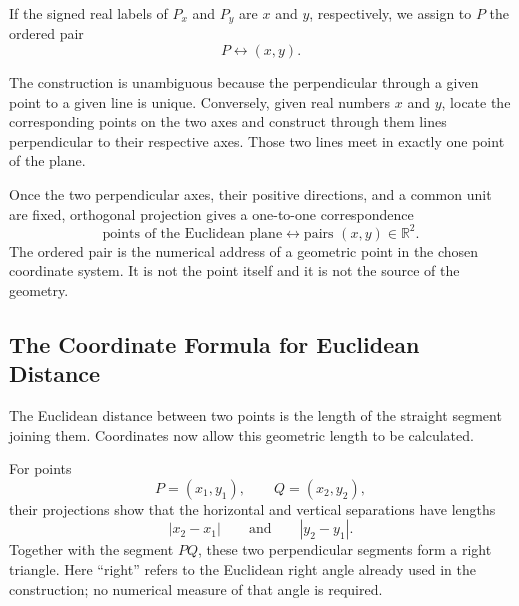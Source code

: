If the signed real labels of $P_x$ and $P_y$ are $x$ and $y$, respectively, we
assign to $P$ the ordered pair
\[
P\longleftrightarrow(x,y).
\]

The construction is unambiguous because the perpendicular through a given point
to a given line is unique. Conversely, given real numbers $x$ and $y$, locate
the corresponding points on the two axes and construct through them lines
perpendicular to their respective axes. Those two lines meet in exactly one
point of the plane.

\begin{theorembox}
Once the two perpendicular axes, their positive directions, and a common unit
are fixed, orthogonal projection gives a one-to-one correspondence
\[
\boxed{
\text{points of the Euclidean plane}
\longleftrightarrow
\text{pairs }(x,y)\in\mathbb R^2
}.
\]
The ordered pair is the numerical address of a geometric point in the chosen
coordinate system. It is not the point itself and it is not the source of the
geometry.
\end{theorembox}

\subsection{The Coordinate Formula for Euclidean Distance}

The Euclidean distance between two points is the length of the straight segment
joining them. Coordinates now allow this geometric length to be calculated.

For points
\[
P=(x_1,y_1),
\qquad
Q=(x_2,y_2),
\]
their projections show that the horizontal and vertical separations have
lengths
\[
|x_2-x_1|
\qquad\text{and}\qquad
|y_2-y_1|.
\]
Together with the segment $PQ$, these two perpendicular segments form a right
triangle. Here ``right'' refers to the Euclidean right angle already used in the
construction; no numerical measure of that angle is required.

\begin{center}
\end{center}

